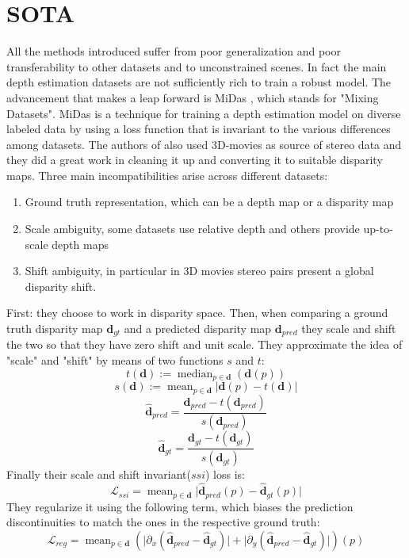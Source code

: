 \section{SOTA}

All the methods introduced suffer from poor generalization and poor transferability to other datasets and to unconstrained scenes.
In fact the main depth estimation datasets are not sufficiently rich to train a robust model.
The advancement that makes a leap forward is MiDas \cite{MiDas}, which stands for "Mixing Datasets".
MiDas is a technique for training a depth estimation model on diverse labeled data by using a loss function that is invariant to the various differences among datasets.
The authors of \cite{MiDas} also used 3D-movies as source of stereo data and they did a great work in cleaning it up and converting it to suitable disparity maps.
Three main incompatibilities arise across different datasets:
\begin{enumerate}
	\item Ground truth representation, which can be a depth map or a disparity map
	\item Scale ambiguity, some datasets use relative depth and others provide up-to-scale depth maps
	\item Shift ambiguity, in particular in 3D movies stereo pairs present a global disparity shift.
\end{enumerate}
First: they choose to work in disparity space.
Then, when comparing a ground truth disparity map $\mathbf{d}_{gt}$ and a predicted disparity map $\mathbf{d}_{pred}$ they scale and shift the two so that they have zero shift and unit scale.
They approximate the idea of "scale" and "shift" by means of two functions $s$ and $t$:
\[
	t(\mathbf{d}) := \mathop{\text{median}}_{p \in \mathbf{d}}(\mathbf{d}(p))
\] \[
	s(\mathbf{d}) := \mathop{\text{mean}}_{p \in \mathbf{d}} \big| \mathbf{d}(p) - t(\mathbf{d}) \big|
\] \[
	\hat{\mathbf{d}}_{pred} = \frac{\mathbf{d}_{pred} - t(\mathbf{d}_{pred})}{s(\mathbf{d}_{pred})}
\] \[
	\hat{\mathbf{d}}_{gt} = \frac{\mathbf{d}_{gt} - t(\mathbf{d}_{gt})}{s(\mathbf{d}_{gt})}
\]
Finally their scale and shift invariant($ssi$) loss is:
\[
	\mathcal{L}_{ssi} = \mathop{\text{mean}}_{p \in \mathbf{d}} \big| \hat{\mathbf{d}}_{pred}(p) - \hat{\mathbf{d}}_{gt}(p)\big|
\]
They regularize it using the following term, which biases the prediction discontinuities to match the ones in the respective ground truth:
\[
	\mathcal{L}_{reg} = \mathop{\text{mean}}_{p \in \mathbf{d}}
		\left(
			\big| \partial_{x} (\hat{\mathbf{d}}_{pred} - \hat{\mathbf{d}}_{gt}) \big| +
			\big| \partial_{y} (\hat{\mathbf{d}}_{pred} - \hat{\mathbf{d}}_{gt}) \big| 
		\right)(p)
\]
